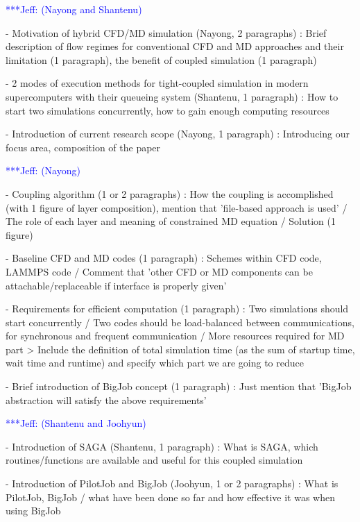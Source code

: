 \documentclass[times, 10pt,twocolumn]{article}
\newcommand{\skonote}[1]{ {\textcolor{blue} { ***Jeff: #1 }}}
\newcommand{\skonote}[1]{}
\begin{document}
\skonote{(Nayong and Shantenu)}

- Motivation of hybrid CFD/MD simulation (Nayong, 2 paragraphs)
: Brief description of flow regimes for conventional CFD and MD approaches and their limitation (1 paragraph), the benefit of coupled simulation (1 paragraph)

- 2 modes of execution methods for tight-coupled simulation in modern supercomputers with their queueing system (Shantenu, 1 paragraph)
: How to start two simulations concurrently, how to gain enough computing resources

- Introduction of current research scope (Nayong, 1 paragraph)
: Introducing our focus area, composition of the paper


\skonote{(Nayong)}

- Coupling algorithm (1 or 2 paragraphs)
: How the coupling is accomplished (with 1 figure of layer composition), mention that 'file-based approach is used' / The role of each layer and meaning of constrained MD equation / Solution (1 figure)

- Baseline CFD and MD codes (1 paragraph)
: Schemes within CFD code, LAMMPS code / Comment that 'other CFD or MD components can be attachable/replaceable if interface is properly given'

- Requirements for efficient computation (1 paragraph)
: Two simulations should start concurrently / Two codes should be load-balanced between communications, for synchronous and frequent communication / More resources required for MD part
> Include the definition of total simulation time (as the sum of startup time, wait time and runtime) and specify which part we are going to reduce

- Brief introduction of BigJob concept (1 paragraph)
: Just mention that 'BigJob abstraction will satisfy the above requirements'


\skonote{(Shantenu and Joohyun)}

- Introduction of SAGA (Shantenu, 1 paragraph)
: What is SAGA, which routines/functions are available and useful for this coupled simulation

- Introduction of PilotJob and BigJob (Joohyun, 1 or 2 paragraphs)
: What is PilotJob, BigJob / what have been done so far and how effective it was when using BigJob
\end{document}
